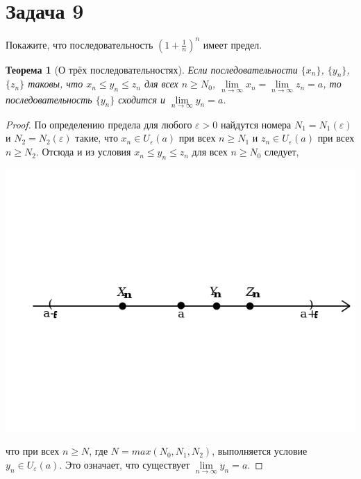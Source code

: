 \documentclass[a4paper,12pt]{article}
\newtheorem*{ther}{Теорема}
\newcommand{\eps}{\varepsilon}
\begin{document}
    \section*{Задача 9}

    Покажите, что последовательность $(1 + \frac{1}{n})^n$ имеет предел.

    \begin{ther}[О трёх последовательностях]
        Если последовательности 
        $\{ x_{n}\}$, $ \{ y_{n} \} $, $ \{ z_{n} \}$
        таковы, что  $x_{n} \leq y_{n} \leq z_{n}$ для всех 
        $n \geq N_{0}$,  $\lim\limits_{n\to \infty }x_{n}=\lim\limits_{n\to \infty }z_{n}=a$, то последовательность  $ \{ y_{n} \}$ сходится и  $\lim\limits_{n\to \infty }y_{n}=a$.
    \end{ther}

    \begin{proof}
        По определению предела для любого $\eps > 0$ найдутся номера $N_{1}=N_{1}(\eps)$ и  $N_{2}=N_{2}(\eps)$ такие, что  $x_{n}\in U_{\eps }(a)$ при всех  $n\geq N_{1}$ и  $z_{n}\in U_{\eps }(a)$ при всех  $n\geq N_{2}$. Отсюда и из условия $x_{n}\leq y_{n}\leq z_{n}$ для всех  $n \geq N_{0}$  следует,
        \begin{center}\includegraphics[scale=0.4]{1.png}\end{center}
        что при всех  $n\geq N$,  где $N = max \left ( N_{0},N_{1},N_{2} \right )$, выполняется условие  $y_{n}\in U_{\varepsilon }(a)$. Это означает, что существует  $\lim\limits_{n\rightarrow \infty }y_{n}=a$.
    \end{proof}
\end{document}
